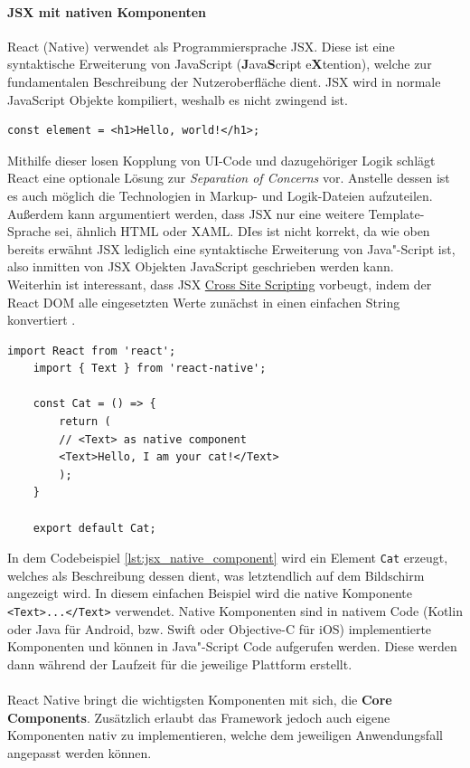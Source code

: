 \paragraph{JSX mit nativen Komponenten}
React (Native) verwendet als Programmiersprache JSX. Diese ist eine syntaktische Erweiterung von JavaScript (\textbf{J}ava\textbf{S}cript e\textbf{X}tention), welche zur fundamentalen Beschreibung der Nutzeroberfläche dient. JSX wird in normale JavaScript Objekte kompiliert, weshalb es nicht zwingend ist. \\
\begin{lstlisting}[caption=JSX Hello World Element]
	const element = <h1>Hello, world!</h1>;
\end{lstlisting}
Mithilfe dieser losen Kopplung von UI-Code und dazugehöriger Logik schlägt React eine optionale Lösung zur \textit{Separation of Concerns} vor. Anstelle dessen ist es auch möglich die Technologien in Markup- und Logik-Dateien aufzuteilen. \\
Außerdem kann argumentiert werden, dass JSX nur eine weitere Template-Sprache sei, ähnlich HTML oder XAML. DIes ist nicht korrekt, da wie oben bereits erwähnt JSX lediglich eine syntaktische Erweiterung von Java"-Script ist, also inmitten von JSX Objekten JavaScript geschrieben werden kann.\\
Weiterhin ist interessant, dass JSX \href{https://owasp.org/www-community/attacks/xss/}{Cross Site Scripting} vorbeugt, indem der React DOM alle eingesetzten Werte zunächst in einen einfachen String konvertiert \cite{react2021}.
\begin{lstlisting}[caption=Native Komponenten, label=lst:jsx_native_component]
	import React from 'react';
	import { Text } from 'react-native';
	
	const Cat = () => {
		return (
		// <Text> as native component
		<Text>Hello, I am your cat!</Text>
		);
	}
	
	export default Cat;
\end{lstlisting}
In dem Codebeispiel \ref{lst:jsx_native_component} wird ein Element \texttt{Cat} erzeugt, welches als Beschreibung dessen dient, was letztendlich auf dem Bildschirm angezeigt wird. 
In diesem einfachen Beispiel wird die native Komponente \texttt{<Text>...</Text>} verwendet. 
Native Komponenten sind in nativem Code (Kotlin oder Java für Android, bzw. Swift oder Objective-C für iOS) implementierte Komponenten und können in Java"-Script Code aufgerufen werden.
Diese werden dann während der Laufzeit für die jeweilige Plattform erstellt.\\
\\
React Native bringt die wichtigsten Komponenten mit sich, die \textbf{Core Components}. Zusätzlich erlaubt das Framework jedoch auch eigene Komponenten nativ zu implementieren, welche dem jeweiligen Anwendungsfall angepasst werden können.\\

